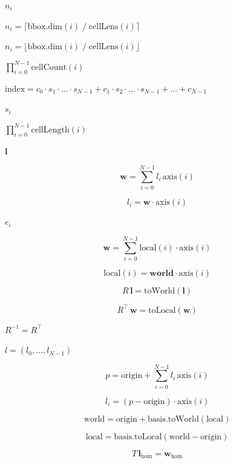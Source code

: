 \documentclass{article}
\begin{document}
$ n_i $
\pagebreak

$ n_i = \lceil \mathrm{bbox.dim}(i) \;/\; \mathrm{cellLens}(i) \rceil
  $
\pagebreak

$ n_i = \lfloor \mathrm{bbox.dim}(i) \;/\; \mathrm{cellLens}(i)
  \rfloor $
\pagebreak

$ \prod_{i=0}^{N-1} \mathrm{cellCount}(i) $
\pagebreak

$ \mathrm{index} = c_0 \cdot s_1 \cdot \ldots \cdot s_{N-1}
    + c_1 \cdot s_2 \cdot \ldots \cdot s_{N-1} + \ldots + c_{N-1} $
\pagebreak

$ s_i $
\pagebreak

$ \prod_{i=0}^{N-1} \mathrm{cellLength}(i) $
\pagebreak

$ \mathbf{l} $
\pagebreak

\[
  \mathbf{w} = \sum_{i=0}^{N-1} l_i \,\mathrm{axis}(i)
\]
\pagebreak

\[
  l_i = \mathbf{w} \cdot \mathrm{axis}(i)
\]
\pagebreak

$ e_i $
\pagebreak

\[
  \mathbf{w} = \sum_{i=0}^{N-1} \mathrm{local}(i) \cdot \mathrm{axis}(i)
\]
\pagebreak

\[
  \mathrm{local}(i) = \mathbf{world} \cdot \mathrm{axis}(i)
\]
\pagebreak

\[ R \, \mathbf{l} = \mathrm{toWorld}(\mathbf{l}) \]
\pagebreak

\[ R^\top \, \mathbf{w} = \mathrm{toLocal}(\mathbf{w}) \]
\pagebreak

$ R^{-1} = R^\top $
\pagebreak

$ l = (l_0, \ldots, l_{N-1}) $
\pagebreak

\[
  p = \mathrm{origin} + \sum_{i=0}^{N-1} l_i \,\mathrm{axis}(i)
\]
\pagebreak

\[
  l_i = (p - \mathrm{origin}) \cdot \mathrm{axis}(i)
\]
\pagebreak

\[
  \mathrm{world} = \mathrm{origin} +
\mathrm{basis.toWorld}(\mathrm{local})
\]
\pagebreak

\[
  \mathrm{local} = \mathrm{basis.toLocal}(\mathrm{world} -
\mathrm{origin})
\]
\pagebreak

\[ T \, \mathbf{l}_{\mathrm{hom}} = \mathbf{w}_{\mathrm{hom}} \]
\pagebreak
\end{document}

